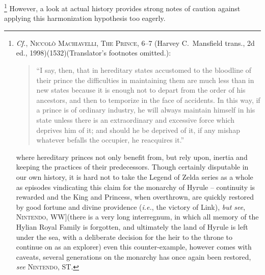 \documentclass[../FGP.tex]{subfiles}
\begin{document}
  \footnote{\textit{Cf.}, \textsc{Niccolò Machiavelli, The Prince}, 6--7 (Harvey C.~Mansfield trans., 2d ed., 1998)(1532)(Translator's footnotes omitted.): \begin{quote}
  ``I say, then, that in hereditary states accustomed to the bloodline of their prince the difficulties in maintaining them are much less than in new states because it is enough not to depart from the order of his ancestors, and then to temporize in the face of accidents. In this way, if a prince is of ordinary industry, he will always maintain himself in his state unless there is an extraordinary and excessive force which deprives him of it; and should he be deprived of it, if any mishap whatever befalls the occupier, he reacquires it.''
  \end{quote}where hereditary princes not only benefit from, but rely upon, inertia and keeping the practices of their predecessors. Though certainly disputable in our own history, it is hard not to take the Legend of Zelda series as a whole as episodes vindicating this claim for the monarchy of Hyrule -- continuity is rewarded and the King and Princess, when overthrown, are quickly restored by good fortune and divine providence (\emph{i.e.}, the victory of Link), \textit{but see}, \textsc{Nintendo, WW}](there is a very long interregnum, in which all memory of the Hylian Royal Family is forgotten, and ultimately the land of Hyrule is left under the sea, with a deliberate decision for the heir to the throne to continue on as an explorer) even this counter-example, however comes with caveats, several generations on the monarchy has once again been restored, \textit{see} \textsc{Nintendo, ST}.} 
However, a look at actual history provides strong notes of caution against applying this harmonization hypothesis too eagerly.
\end{document}
